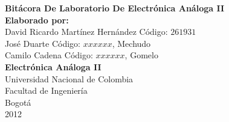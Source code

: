 \documentclass[11pt,graphicx,caption,rotating]{article}
\begin{document}
\begin{titlepage}
\begin{center}
{\huge \textbf{Bitácora De Laboratorio De Electrónica Análoga II}}\\[6cm]
{\Large \textbf{Elaborado por:}}\\
{\Large David Ricardo Martínez Hernández Código: $261931$}\\
{\Large José Duarte Código: $xxxxxx$, Mechudo}\\
{\Large Camilo Cadena Código: $xxxxxx$, Gomelo}\\[7cm]
{\Large \textbf{Electrónica Análoga II}}\\[6cm]
{\Large Universidad Nacional de Colombia}\\
{\Large Facultad de Ingeniería}\\
{\Large Bogotá}\\
{\Large 2012}\\
\date{}
\end{center}
\end{titlepage}
\tableofcontents
\listoftables
\listoffigures

\newpage

\end{document}
